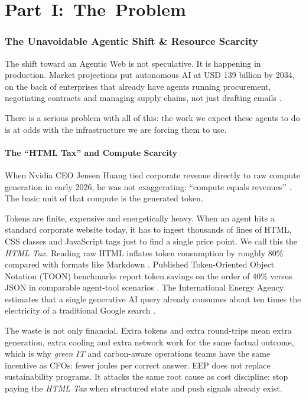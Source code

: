 \documentclass[12pt,a4paper]{article}
\begin{document}
\part*{Part~I:~The~Problem}
\section{The Unavoidable Agentic Shift \& Resource Scarcity}

The shift toward an Agentic Web is not speculative. It is happening in production. Market projections put autonomous AI at USD 139 billion by 2034, on the back of enterprises that already have agents running procurement, negotiating contracts and managing supply chains, not just drafting emails \cite{ref1, ref7, ref8}.

There is a serious problem with all of this: the work we expect these agents to do is at odds with the infrastructure we are forcing them to use.

\subsection{The ``HTML Tax'' and Compute Scarcity}

When Nvidia CEO Jensen Huang tied corporate revenue directly to raw compute generation in early 2026, he was not exaggerating: ``compute equals revenues'' \cite{ref2}. The basic unit of that compute is the generated token.

Tokens are finite, expensive and energetically heavy. When an agent hits a standard corporate website today, it has to ingest thousands of lines of HTML, CSS classes and JavaScript tags just to find a single price point. We call this the \textit{HTML Tax}. Reading raw HTML inflates token consumption by roughly 80\% compared with formats like Markdown \cite{ref3}. Published Token-Oriented Object Notation (TOON) benchmarks report token savings on the order of 40\% versus JSON in comparable agent-tool scenarios \cite{ref31}. The International Energy Agency estimates that a single generative AI query already consumes about ten times the electricity of a traditional Google search \cite{ref4}.

The waste is not only financial. Extra tokens and extra round-trips mean extra generation, extra cooling and extra network work for the same factual outcome, which is why \textit{green IT} and carbon-aware operations teams have the same incentive as CFOs: fewer joules per correct answer. EEP does not replace sustainability programs. It attacks the same root cause as cost discipline: stop paying the \textit{HTML Tax} when structured state and push signals already exist.
\end{document}
